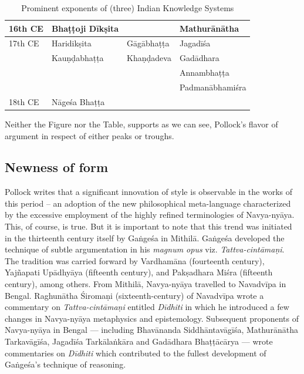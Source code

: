 \begin{table}[H]
\begin{tabular}{|l|l|l|l|}
16th CE & Bhaṭṭoji Dīkṣita\index{Bhattojidiksita@Bhaṭṭojī Dīkṣita} & & Mathurānātha\\\hline
17th CE & Haridikṣita & Gāgābhaṭṭa\index{Gagabhatta@Gāgābhaṭṭa} & Jagadīśa\\\hline
& Kauṇḍabhaṭṭa\index{Kaundabhatta@Kauṇḍabhaṭṭa} & Khaṇḍadeva & Gadādhara\index{Gadadhara@Gadādhara}\\\hline
& & & Annambhaṭṭa\index{Annambhatta@Annambhaṭṭa}\\\hline
& & & Padmanābhamiśra\\\hline
18th CE  & Nāgeśa Bhaṭṭa\index{Nagesabhatta@Nāgeśabhaṭṭa} & & \\\hline
\end{tabular}
\caption{Prominent exponents of (three) Indian Knowledge Systems}\label{chap2-tab1}
\end{table}

\newpage

Neither the Figure nor the Table, supports as we can see, Pollock’s flavor of argument in respect of either peaks or troughs.

\subsection{Newness of form}%

Pollock writes that a significant innovation of style is observable in the works of this period – an adoption of the new philosophical meta-language characterized by the excessive employment of the highly refined terminologies of Navya-nyāya. This, of course, is true. But it is important to note that this trend was initiated in the thirteenth century itself by Gaṅgeśa in Mithilā. Gaṅgeśa developed the technique of subtle argumentation in his {\sl magnum opus}  viz. {\sl Tattva-cintāmaṇi}. The tradition was carried forward by Vardhamāna (fourteenth century), Yajñapati Upādhyāya (fifteenth century), and Pakṣadhara Miśra (fifteenth century), among others. From Mithilā, Navya-nyāya travelled to Navadvīpa in Bengal. Raghunātha Śiromaṇi (sixteenth-century) of Navadvīpa wrote a commentary on {\sl Tattva-cintāmaṇi} entitled {\sl Dīdhiti} in which he introduced a few changes in Navya-nyāya metaphysics and epistemology. Subsequent proponents of Navya-nyāya in Bengal — including Bhavānanda Siddhāntavāgīśa, Mathurānātha Tarkavāgīśa, Jagadīśa Tarkālaṅkāra and Gadādhara Bhaṭṭācārya — wrote commentaries on {\sl Dīdhiti} which contributed to the fullest development of Gaṅgeśa’s technique of reasoning. 

